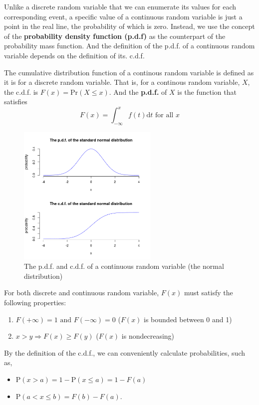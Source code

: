 \documentclass[a4paper,11pt]{article}
\begin{document}
Unlike a discrete random variable that we can enumerate its values for
each corresponding event, a specific value of a continuous random
variable is just a point in the real line, the probability of which is
zero. Instead, we use the concept of the \textbf{probability density function
(p.d.f)} as the counterpart of the probability mass function. And the
definition of the p.d.f. of a continuous random variable depends on
the definition of its. c.d.f.

The cumulative distribution function of a continous random variable
is defined as it is for a discrete random variable. That is, for a
continous random variable, \(X\), the c.d.f. is \(F(x) = \mathrm{Pr}(X
\leq x)\). And the \textbf{p.d.f.} of \(X\) is the function that satisfies
\[ F(x) = \int_{-\infty}^{x} f(t) \mathrm{d}t \text{ for all } x \]

\begin{figure}[htbp]
\centering
\includegraphics[width=0.6\textwidth,height=0.5\textheight]{figure/norm1.png}
\caption{\label{fig:orgc70b1f8}
The p.d.f. and c.d.f. of a continuous random variable (the normal distribution)}
\end{figure}

For both discrete and continuous random variable, \(F(x)\) must satisfy
the following properties:
\begin{enumerate}
\item \(F(+\infty) = 1 \text{ and } F(-\infty) = 0\) (\(F(x)\) is bounded between 0 and 1)
\item \(x > y \Rightarrow F(x) \geq F(y)\) (\(F(x)\) is nondecreasing)
\end{enumerate}

By the definition of the c.d.f., we can conveniently calculate
probabilities, such as,
\begin{itemize}
\item \(\mathrm{P}(x > a) = 1 - \mathrm{P}(x \leq a) = 1 - F(a)\)
\item \(\mathrm{P}(a < x \leq b) = F(b) - F(a)\).
\end{itemize}
\end{document}
